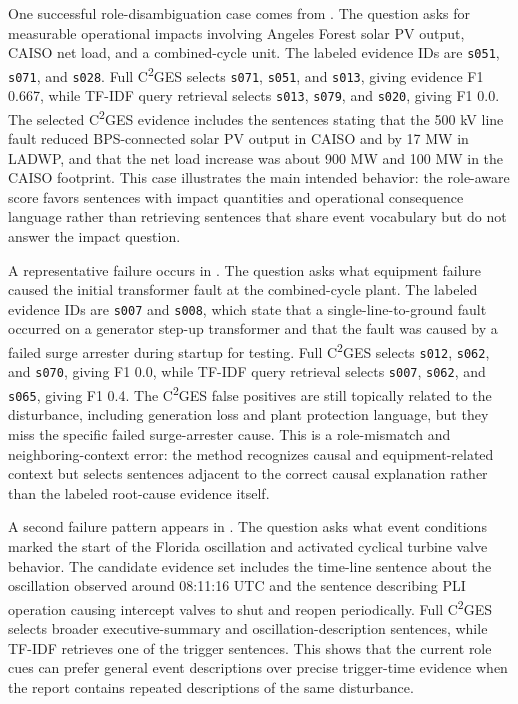 \documentclass{ieeeaccess}
\begin{document}
One successful role-disambiguation case comes from . The question asks for measurable operational impacts involving Angeles Forest solar PV output, CAISO net load, and a combined-cycle unit. The labeled evidence IDs are \texttt{s051}, \texttt{s071}, and \texttt{s028}. Full C\textsuperscript{2}GES selects \texttt{s071}, \texttt{s051}, and \texttt{s013}, giving evidence F1 0.667, while TF-IDF query retrieval selects \texttt{s013}, \texttt{s079}, and \texttt{s020}, giving F1 0.0. The selected C\textsuperscript{2}GES evidence includes the sentences stating that the 500 kV line fault reduced BPS-connected solar PV output in CAISO and by 17 MW in LADWP, and that the net load increase was about 900 MW and 100 MW in the CAISO footprint. This case illustrates the main intended behavior: the role-aware score favors sentences with impact quantities and operational consequence language rather than retrieving sentences that share event vocabulary but do not answer the impact question.

A representative failure occurs in . The question asks what equipment failure caused the initial transformer fault at the combined-cycle plant. The labeled evidence IDs are \texttt{s007} and \texttt{s008}, which state that a single-line-to-ground fault occurred on a generator step-up transformer and that the fault was caused by a failed surge arrester during startup for testing. Full C\textsuperscript{2}GES selects \texttt{s012}, \texttt{s062}, and \texttt{s070}, giving F1 0.0, while TF-IDF query retrieval selects \texttt{s007}, \texttt{s062}, and \texttt{s065}, giving F1 0.4. The C\textsuperscript{2}GES false positives are still topically related to the disturbance, including generation loss and plant protection language, but they miss the specific failed surge-arrester cause. This is a role-mismatch and neighboring-context error: the method recognizes causal and equipment-related context but selects sentences adjacent to the correct causal explanation rather than the labeled root-cause evidence itself.

A second failure pattern appears in . The question asks what event conditions marked the start of the Florida oscillation and activated cyclical turbine valve behavior. The candidate evidence set includes the time-line sentence about the oscillation observed around 08:11:16 UTC and the sentence describing PLI operation causing intercept valves to shut and reopen periodically. Full C\textsuperscript{2}GES selects broader executive-summary and oscillation-description sentences, while TF-IDF retrieves one of the trigger sentences. This shows that the current role cues can prefer general event descriptions over precise trigger-time evidence when the report contains repeated descriptions of the same disturbance.
\end{document}
